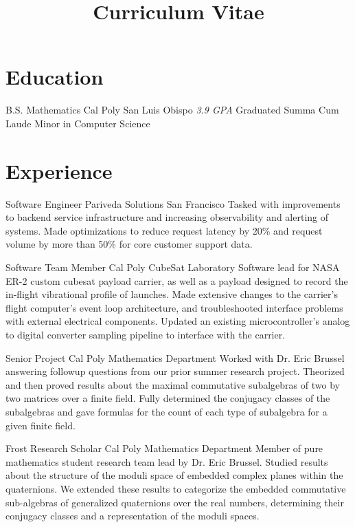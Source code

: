 \documentclass[letterpaper, 11pt, sans]{moderncv}
\title{Curriculum Vitae}
\begin{document}
\makecvtitle

\section{Education}
        {B.S. Mathematics}
        {Cal Poly}
        {San Luis Obispo}
        {\textit{3.9 GPA}}
        {
            Graduated Summa Cum Laude\newline
            Minor in Computer Science\newline
        }

\section{Experience}

        {Software Engineer}
        {Pariveda Solutions}
        {San Francisco}{}
        {
            Tasked with improvements to backend service infrastructure and increasing observability and alerting of systems.
            Made optimizations to reduce request latency by 20\% and request volume by more than 50\% for core customer support data.
        }

        {Software Team Member}
        {Cal Poly CubeSat Laboratory}{}{}
        {
            Software lead for NASA ER-2 custom cubesat payload carrier, as well as a payload designed to record the in-flight vibrational profile of launches.
            Made extensive changes to the carrier's flight computer's event loop architecture, and troubleshooted interface problems with external electrical components.
            Updated an existing microcontroller's analog to digital converter sampling pipeline to interface with the carrier.
        }

        {Senior Project}
        {Cal Poly Mathematics Department}{}{}
        {
            Worked with Dr. Eric Brussel answering followup questions from our prior summer research project.
            Theorized and then proved results about the maximal commutative subalgebras of two by two matrices over a finite field.
            Fully determined the conjugacy classes of the subalgebras and gave formulas for the count of each type of subalgebra for a given finite field.
        }

        {Frost Research Scholar}
        {Cal Poly Mathematics Department}{}{}
        {
            Member of pure mathematics student research team lead by Dr. Eric Brussel.
            Studied results about the structure of the moduli space of embedded complex planes within the quaternions.
            We extended these results to categorize the embedded commutative sub-algebras of generalized quaternions over the real numbers, determining their conjugacy classes and a representation of the moduli spaces.
        }
\end{document}

